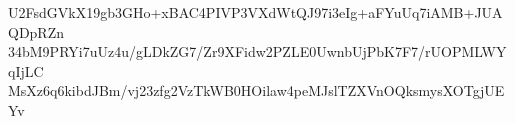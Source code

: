 U2FsdGVkX19gb3GHo+xBAC4PIVP3VXdWtQJ97i3eIg+aFYuUq7iAMB+JUAQDpRZn
34bM9PRYi7uUz4u/gLDkZG7/Zr9XFidw2PZLE0UwnbUjPbK7F7/rUOPMLWYqIjLC
MsXz6q6kibdJBm/vj23zfg2VzTkWB0HOilaw4peMJslTZXVnOQksmysXOTgjUEYv
